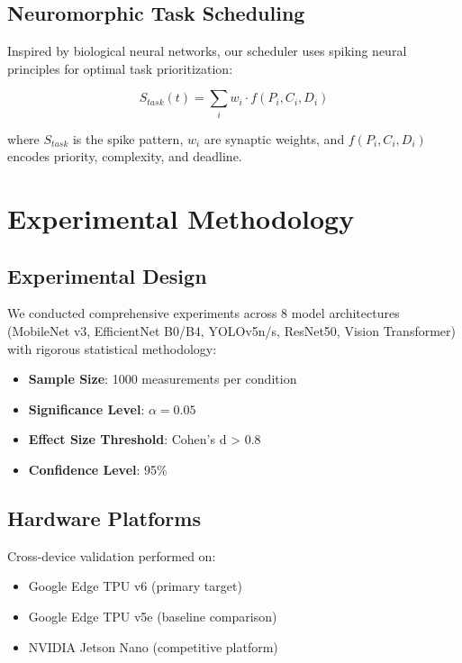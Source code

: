 \documentclass[conference]{IEEEtran}
\begin{document}
\subsection{Neuromorphic Task Scheduling}

Inspired by biological neural networks, our scheduler uses spiking neural principles for optimal task prioritization:

\begin{equation}
S_{task}(t) = \sum_i w_i \cdot f(P_i, C_i, D_i)
\end{equation}

where $S_{task}$ is the spike pattern, $w_i$ are synaptic weights, and $f(P_i, C_i, D_i)$ encodes priority, complexity, and deadline.

\section{Experimental Methodology}

\subsection{Experimental Design}

We conducted comprehensive experiments across 8 model architectures (MobileNet v3, EfficientNet B0/B4, YOLOv5n/s, ResNet50, Vision Transformer) with rigorous statistical methodology:

\begin{itemize}
\item \textbf{Sample Size}: 1000 measurements per condition
\item \textbf{Significance Level}: $\alpha = 0.05$
\item \textbf{Effect Size Threshold}: Cohen's d > 0.8
\item \textbf{Confidence Level}: 95\%
\end{itemize}

\subsection{Hardware Platforms}

Cross-device validation performed on:
\begin{itemize}
\item Google Edge TPU v6 (primary target)
\item Google Edge TPU v5e (baseline comparison)
\item NVIDIA Jetson Nano (competitive platform)
\end{itemize}
\end{document}
